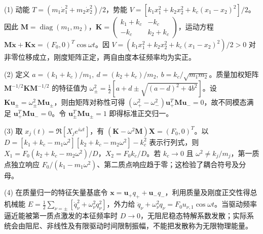 (1) 动能 \(T=(m_1\dot x_1^2+m_2\dot x_2^2)/2\)，势能 \(V=[k_1x_1^2+k_2x_2^2+k_c(x_1-x_2)^2]/2\)。因此 \(\mathbf M=\operatorname{diag}(m_1,m_2)\)，\(\mathbf K=\begin{pmatrix}k_1+k_c&-k_c\\-k_c&k_2+k_c\end{pmatrix}\)，运动方程 \(\mathbf M\ddot{\mathbf x}+\mathbf K\mathbf x=(F_0,0)^T\cos\omega t\)。因 \(V=(k_1x_1^2+k_2x_2^2+k_c(x_1-x_2)^2)/2>0\) 对非零位移成立，刚度矩阵正定，两自由度本征频率均为实正。

(2) 定义 \(a=(k_1+k_c)/m_1,\ d=(k_2+k_c)/m_2,\ b=k_c/\sqrt{m_1m_2}\)。质量加权矩阵 \(\mathbf M^{-1/2}\mathbf K\mathbf M^{-1/2}\) 的特征值为 \(\omega_\pm^2=\frac12[a+d\pm\sqrt{(a-d)^2+4b^2}]\)。设 \(\mathbf K\mathbf u_\pm=\omega_\pm^2\mathbf M\mathbf u_\pm\)，则由矩阵对称性可得 \((\omega_+^2-\omega_-^2)\mathbf u_+^T\mathbf M\mathbf u_-=0\)，故不同模态满足 \(\mathbf u_+^T\mathbf M\mathbf u_-=0\)。令 \(\mathbf u_\pm^T\mathbf M\mathbf u_\pm=1\) 即得标准正交归一。

(3) 取 \(x_j(t)=\Re[X_je^{i\omega t}]\)，有 \((\mathbf K-\omega^2\mathbf M)\mathbf X=(F_0,0)^T\)。以 \(D=[k_1+k_c-m_1\omega^2][k_2+k_c-m_2\omega^2]-k_c^2\) 表示行列式，则 \(X_1=F_0(k_2+k_c-m_2\omega^2)/D\)，\(X_2=F_0k_c/D\)。若 \(k_c\to0\) 且 \(\omega^2\ne k_j/m_j\)，第一质点独立响应 \(F_0/(k_1-m_1\omega^2)\)、第二质点响应趋于零；这检验了耦合符号及分母。

(4) 在质量归一的特征矢量基底令 \(\mathbf x=\mathbf u_+q_++\mathbf u_-q_-\)，利用质量及刚度正交性得总机械能 \(E=\frac12\sum_{\nu=\pm}[\dot q_\nu^2+\omega_\nu^2q_\nu^2]\)，外力给 \(\ddot q_\nu+\omega_\nu^2q_\nu=F_0u_{\nu,1}\cos\omega t\)。当驱动频率逼近能被第一质点激发的本征频率时 \(D\to0\)，无阻尼稳态特解系数发散；实际系统会由阻尼、非线性及有限驱动时间限制振幅，不能把发散称为无限物理能量。
